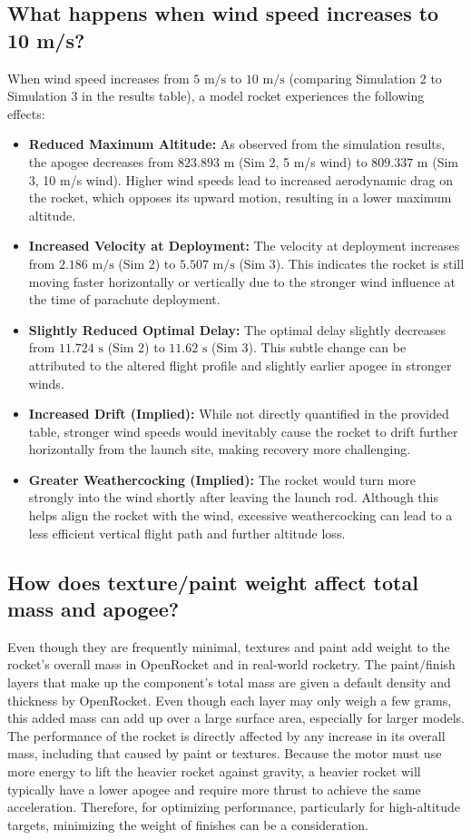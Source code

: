 \documentclass[12pt, a4paper]{article}
\begin{document}
\subsection{What happens when wind speed increases to 10 m/s?}
When wind speed increases from $5 \text{ m/s}$ to $10 \text{ m/s}$ (comparing Simulation 2 to Simulation 3 in the results table), a model rocket experiences the following effects:
\begin{itemize}
    \item \textbf{Reduced Maximum Altitude:} As observed from the simulation results, the apogee decreases from $823.893 \text{ m}$ (Sim 2, 5 m/s wind) to $809.337 \text{ m}$ (Sim 3, 10 m/s wind). Higher wind speeds lead to increased aerodynamic drag on the rocket, which opposes its upward motion, resulting in a lower maximum altitude.
    \item \textbf{Increased Velocity at Deployment:} The velocity at deployment increases from $2.186 \text{ m/s}$ (Sim 2) to $5.507 \text{ m/s}$ (Sim 3). This indicates the rocket is still moving faster horizontally or vertically due to the stronger wind influence at the time of parachute deployment.
    \item \textbf{Slightly Reduced Optimal Delay:} The optimal delay slightly decreases from $11.724 \text{ s}$ (Sim 2) to $11.62 \text{ s}$ (Sim 3). This subtle change can be attributed to the altered flight profile and slightly earlier apogee in stronger winds.
    \item \textbf{Increased Drift (Implied):} While not directly quantified in the provided table, stronger wind speeds would inevitably cause the rocket to drift further horizontally from the launch site, making recovery more challenging.
    \item \textbf{Greater Weathercocking (Implied):} The rocket would turn more strongly into the wind shortly after leaving the launch rod. Although this helps align the rocket with the wind, excessive weathercocking can lead to a less efficient vertical flight path and further altitude loss.
\end{itemize}

\subsection{How does texture/paint weight affect total mass and apogee?}
Even though they are frequently minimal, textures and paint add weight to the rocket's overall mass in OpenRocket and in real-world rocketry. The paint/finish layers that make up the component's total mass are given a default density and thickness by OpenRocket. Even though each layer may only weigh a few grams, this added mass can add up over a large surface area, especially for larger models. The performance of the rocket is directly affected by any increase in its overall mass, including that caused by paint or textures. Because the motor must use more energy to lift the heavier rocket against gravity, a heavier rocket will typically have a lower apogee and require more thrust to achieve the same acceleration. Therefore, for optimizing performance, particularly for high-altitude targets, minimizing the weight of finishes can be a consideration.
\end{document}
